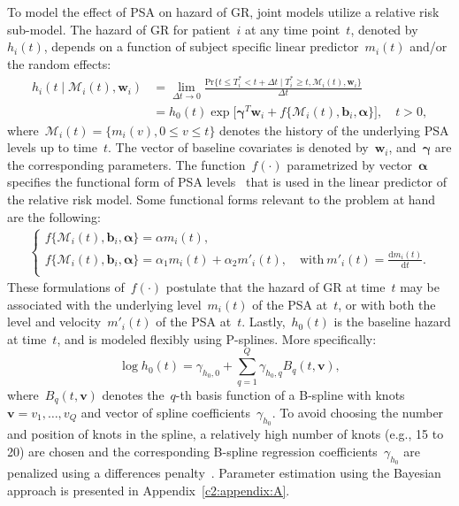 To model the effect of PSA on hazard of GR, joint models utilize a relative risk sub-model. The hazard of GR for patient~$i$ at any time point~$t$, denoted by~$h_i(t)$, depends on a function of subject specific linear predictor~$m_i(t)$ and/or the random effects:
\begin{align*}
h_i(t \mid \mathcal{M}_i(t), \boldsymbol{w}_i) &= \lim_{\Delta t \to 0} \frac{\mbox{Pr}\big\{t \leq T^*_i < t + \Delta t \mid T^*_i \geq t, \mathcal{M}_i(t), \boldsymbol{w}_i\big\}}{\Delta t}\\
&=h_0(t) \exp\big[\boldsymbol{\gamma}^T\boldsymbol{w}_i + f\{\mathcal{M}_i(t), \boldsymbol{b}_i, \boldsymbol{\alpha}\}\big], \quad t>0,
\end{align*}
where~$\mathcal{M}_i(t) = \{m_i(v), 0\leq v \leq t\}$ denotes the history of the underlying PSA levels up to time~$t$. The vector of baseline covariates is denoted by~$\boldsymbol{w}_i$, and~$\boldsymbol{\gamma}$ are the corresponding parameters. The function~$f(\cdot)$ parametrized by vector~$\boldsymbol{\alpha}$ specifies the functional form of PSA levels~\citep{brown2009assessing,rizopoulos2012joint,taylor2013real,rizopoulos2014bma} that is used in the linear predictor of the relative risk model. Some functional forms relevant to the problem at hand are the following: 
\begin{eqnarray*}
\left \{
\begin{array}{l}
f\{\mathcal{M}_i(t), \boldsymbol{b}_i, \boldsymbol{\alpha}\} = \alpha m_i(t),\\
f\{\mathcal{M}_i(t), \boldsymbol{b}_i, \boldsymbol{\alpha}\} = \alpha_1 m_i(t) + \alpha_2 m'_i(t),\quad \text{with}\  m'_i(t) = \frac{\mathrm{d}{m_i(t)}}{\mathrm{d}{t}}.\\
\end{array}
\right.
\end{eqnarray*}
These formulations of~$f(\cdot)$ postulate that the hazard of GR at time~$t$ may be associated with the underlying level~$m_i(t)$ of the PSA at~$t$, or with both the level and velocity~$m'_i(t)$ of the PSA at~$t$. Lastly,~$h_0(t)$ is the baseline hazard at time~$t$, and is modeled flexibly using P-splines. More specifically:
\begin{equation*}
\log{h_0(t)} = \gamma_{h_0,0} + \sum_{q=1}^Q \gamma_{h_0,q} B_q(t, \boldsymbol{v}),
\end{equation*}
where~$B_q(t, \boldsymbol{v})$ denotes the~$q$-th basis function of a B-spline with knots ${\boldsymbol{v} = v_1, \ldots, v_Q}$ and vector of spline coefficients~$\gamma_{h_0}$. To avoid choosing the number and position of knots in the spline, a relatively high number of knots (e.g., 15 to 20) are chosen and the corresponding B-spline regression coefficients~$\gamma_{h_0}$ are penalized using a differences penalty~\citep{eilers1996flexible}. Parameter estimation using the Bayesian approach is presented in Appendix~\ref{c2:appendix:A}.